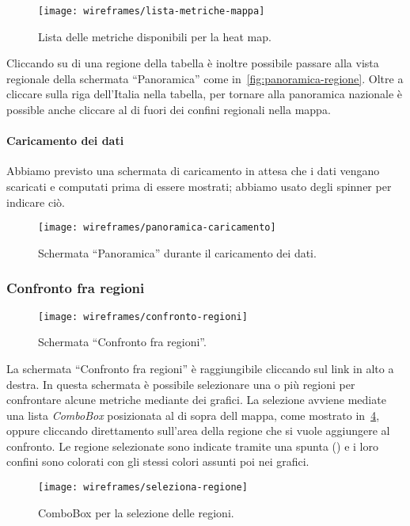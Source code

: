 \begin{figure}[H]
    \centering
    \texttt{[image: wireframes/lista-metriche-mappa]}
    \caption{Lista delle metriche disponibili per la heat map.}
    \label{fig:lista-metriche-mappa}
\end{figure}

Cliccando su di una regione della tabella è inoltre possibile passare alla vista regionale della schermata ``Panoramica'' come in~\ref{fig:panoramica-regione}. Oltre a cliccare sulla riga dell'Italia nella tabella, per tornare alla panoramica nazionale è possible anche cliccare al di fuori dei confini regionali nella mappa.

\paragraph{Caricamento dei dati}
Abbiamo previsto una schermata di caricamento in attesa che i dati vengano scaricati e computati prima di essere mostrati; abbiamo usato degli spinner per indicare ciò.
\begin{figure}[H]
    \centering
    \texttt{[image: wireframes/panoramica-caricamento]}
    \caption{Schermata ``Panoramica'' durante il caricamento dei dati.}
    \label{fig:panoramica-caricamento}
\end{figure}


\subsubsection{Confronto fra regioni}\label{ss:confronto-fra-regioni}
\begin{figure}[H]
    \centering
    \texttt{[image: wireframes/confronto-regioni]}
    \caption{Schermata ``Confronto fra regioni''.}
    \label{fig:confronto-regioni}
\end{figure}
La schermata ``Confronto fra regioni'' è raggiungibile cliccando sul link in alto a destra. In questa schermata è possibile selezionare una o più regioni per confrontare alcune metriche mediante dei grafici. La selezione avviene mediate una lista \textit{ComboBox} posizionata al di sopra dell mappa, come mostrato in~\ref{fig:seleziona-regione}, oppure cliccando direttamento sull'area della regione che si vuole aggiungere al confronto. Le regione selezionate sono indicate tramite una spunta (\checkmark) e i loro confini sono colorati con gli stessi colori assunti poi nei grafici.

\begin{figure}[H]
    \centering
    \texttt{[image: wireframes/seleziona-regione]}
    \caption{ComboBox per la selezione delle regioni.}
    \label{fig:seleziona-regione}
\end{figure}

